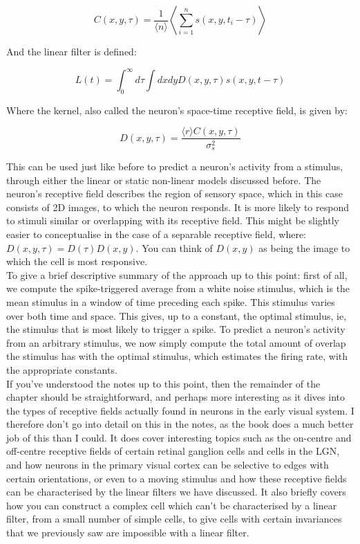 \documentclass{article}
\begin{document}
\begin{equation*}
	C(x,y,\tau) = \frac{1}{\langle n \rangle} \left \langle \sum_{i=1}^n s(x,y,t_i-\tau) \right \rangle
\end{equation*}

And the linear filter is defined:

\begin{equation*}
	L(t) = \int_0^\infty d\tau\int dx dy D(x,y,\tau)s(x,y,t-\tau)
\end{equation*}

Where the kernel, also called the neuron's space-time receptive field, is given by:

\begin{equation*}
	D(x,y,\tau) = \frac{\langle r \rangle C(x,y,\tau)}{\sigma_s^2}
\end{equation*}

This can be used just like before to predict a neuron's activity from a stimulus, through either the linear or static non-linear models discussed before. The neuron's receptive field describes the region of sensory space, which in this case consists of 2D images, to which the neuron responds. It is more likely to respond to stimuli similar or overlapping with its receptive field. This might be slightly easier to conceptualise in the case of a separable receptive field, where: $D(x,y,\tau)=D(\tau)D(x,y)$. You can think of $D(x,y)$ as being the image to which the cell is most responsive.\\

To give a brief descriptive summary of the approach up to this point: first of all, we compute the spike-triggered average from a white noise stimulus, which is the mean stimulus in a window of time preceding each spike. This stimulus varies over both time and space. This gives, up to a constant, the optimal stimulus, ie, the stimulus that is most likely to trigger a spike. To predict a neuron's activity from an arbitrary stimulus, we now simply compute the total amount of overlap the stimulus has with the optimal stimulus, which estimates the firing rate, with the appropriate constants.\\

If you've understood the notes up to this point, then the remainder of the chapter should be straightforward, and perhaps more interesting as it dives into the types of receptive fields actually found in neurons in the early visual system. I therefore don't go into detail on this in the notes, as the book does a much better job of this than I could. It does cover interesting topics such as the on-centre and off-centre receptive fields of certain retinal ganglion cells and cells in the LGN, and how neurons in the primary visual cortex can be selective to edges with certain orientations, or even to a moving stimulus and how these receptive fields can be characterised by the linear filters we have discussed. It also briefly covers how you can construct a complex cell which can't be characterised by a linear filter, from a small number of simple cells, to give cells with certain invariances that we previously saw are impossible with a linear filter.\\
\end{document}
